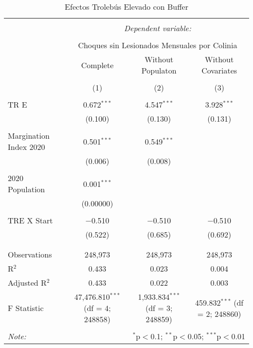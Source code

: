 
\begin{table}[!htbp] \centering 
  \caption{Efectos Trolebús Elevado con Buffer} 
  \label{} 
\begin{tabular}{@{\extracolsep{5pt}}lccc} 
\\[-1.8ex]\hline 
\hline \\[-1.8ex] 
 & \multicolumn{3}{c}{\textit{Dependent variable:}} \\ 
\cline{2-4} 
\\[-1.8ex] & \multicolumn{3}{c}{Choques sin Lesionados Mensuales por Colinia} \\ 
 & Complete & Without Populaton & Without Covariates \\ 
\\[-1.8ex] & (1) & (2) & (3)\\ 
\hline \\[-1.8ex] 
 TR E & 0.672$^{***}$ & 4.547$^{***}$ & 3.928$^{***}$ \\ 
  & (0.100) & (0.130) & (0.131) \\ 
  & & & \\ 
 Margination Index 2020 & 0.501$^{***}$ & 0.549$^{***}$ &  \\ 
  & (0.006) & (0.008) &  \\ 
  & & & \\ 
 2020 Population & 0.001$^{***}$ &  &  \\ 
  & (0.00000) &  &  \\ 
  & & & \\ 
 TRE X Start & $-$0.510 & $-$0.510 & $-$0.510 \\ 
  & (0.522) & (0.685) & (0.692) \\ 
  & & & \\ 
\hline \\[-1.8ex] 
Observations & 248,973 & 248,973 & 248,973 \\ 
R$^{2}$ & 0.433 & 0.023 & 0.004 \\ 
Adjusted R$^{2}$ & 0.433 & 0.022 & 0.003 \\ 
F Statistic & 47,476.810$^{***}$ (df = 4; 248858) & 1,933.834$^{***}$ (df = 3; 248859) & 459.832$^{***}$ (df = 2; 248860) \\ 
\hline 
\hline \\[-1.8ex] 
\textit{Note:}  & \multicolumn{3}{r}{$^{*}$p$<$0.1; $^{**}$p$<$0.05; $^{***}$p$<$0.01} \\ 
\end{tabular} 
\end{table} 
